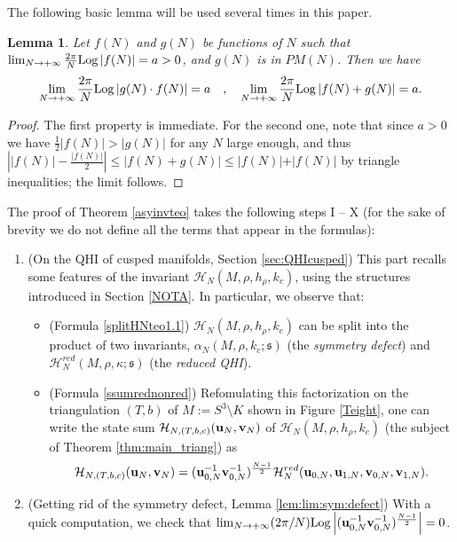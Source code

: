 \documentclass[11pt]{amsart}
\newtheorem{lem}[teo]{Lemma}
\newcommand{\bu}{{\bf u}}
\newcommand{\bv}{{\bf v}}
\newcommand{\Log}{{\rm Log}}
\newcommand{\Hh}{{\mathcal H}}
\newcommand{\ra}{\rightarrow}
\begin{document}
The following basic lemma will be used several times in this paper.
\begin{lem}\label{lem:PM:SE}
Let $f(N)$ and $g(N)$ be functions of $N$ such that $\lim_{N\ra +\infty} \textstyle \frac{2\pi}{N}\Log \left \vert f(N) \right \vert = a > 0$, and $g(N)$ is in $PM(N)$. Then we have
$$\lim_{N\ra +\infty} \dfrac{2\pi}{N}\Log \left \vert g(N)\cdot f(N) \right \vert = a \quad ,\quad  \lim_{N\ra +\infty}  \frac{2\pi}{N}\Log \left \vert f(N) + g(N) \right \vert = a.$$
\end{lem}

\begin{proof}
The first property is immediate. For the second one, note that since $a>0$ we have $\textstyle \frac{1}{2}|f(N)|>|g(N)|$ for any $N$ large enough, and thus $\textstyle \left \vert \vert f(N) \vert - \frac{\vert f(N) \vert}{2} \right \vert \leqslant \left \vert f(N) + g(N) \right \vert \leqslant \left \vert f(N)\right \vert + \vert f(N) \vert  $ by triangle inequalities; the limit follows. 
\end{proof}
\medskip

The proof of Theorem \ref{asyinvteo} takes the following steps I -- X (for the sake of brevity we do not define all the terms that appear in the formulas):
\medskip

\begin{enumerate}[label=\Roman*)]
\item (On the QHI of cusped manifolds, Section \ref{sec:QHIcusped}) This part recalls some features of the invariant $\Hh_{N}(M,\rho,h_\rho,k_c)$, using the structures introduced in Section \ref{NOTA}. In particular, we observe that:
\smallskip

\begin{itemize}
\item (Formula \eqref{splitHNteo1.1}) $\Hh_{N}(M,\rho,h_\rho,k_c)$ can be split into the product of two invariants, $\alpha_N(M,\rho,k_c;\mathfrak{s})$ (the \textit{symmetry defect}) and $\Hh_N^{red}(M,\rho,\kappa;\mathfrak{s})$ (the \textit{reduced QHI}).
\item (Formula \eqref{ssumrednonred}) Refomulating this factorization on the triangulation $(T,b)$ of $M:=S^3\setminus K$ shown in Figure \ref{Teight}, one can write the state sum $\Hh_{N,(T,b,c)}(\bu_N,\bv_N)$ of $\Hh_{N}(M,\rho,h_\rho,k_c)$ (the subject of Theorem \ref{thm:main_triang}) as 
$$\Hh_{N,(T,b,c)}(\bu_N,\bv_N) = (\bu_{0,N}^{-1}\bv_{0,N}^{-1})^{\frac{N-1}{2}}\Hh_{N}^{red}(\bu_{0,N},\bu_{1,N},\bv_{0,N},\bv_{1,N}).$$
\end{itemize}
\smallskip

\item (Getting rid of the symmetry defect, Lemma \ref{lem:lim:sym:defect}) With a quick computation, we check that $\textstyle \lim_{N\ra +\infty} (2\pi/N) \Log \left \vert (\bu_{0,N}^{-1}\bv_{0,N}^{-1})^{\frac{N-1}{2}} \right \vert =0$.
\end{enumerate}
\medskip
\end{document}
